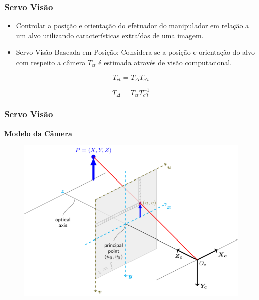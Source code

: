 \documentclass{beamer}
\begin{document}
\begin{frame}
\frametitle{Servo Visão}
\begin{itemize}
\item Controlar a posição e orientação do efetuador do manipulador em relação a um alvo utilizando características extraídas de uma imagem.
\item Servo Visão Baseada em Posição: Considera-se a posição e orientação do alvo com respeito a câmera ${T}_{ct}$ é estimada através de visão computacional. 
\end{itemize}

\begin{equation}
 {T}_{ct} =  {T}_\Delta {T}_{c't}
\end{equation}

\begin{equation}
 {T}_\Delta  =   {T}_{ct} {T}_{c't}^{-1}
\end{equation}
\end{frame}


\begin{frame}
\frametitle{Servo Visão}
\textbf{Modelo da Câmera}
\begin{figure}
\includegraphics[height=0.75\paperheight]{./img/camera_model3.png}
\end{figure}
\end{frame}
\end{document}
